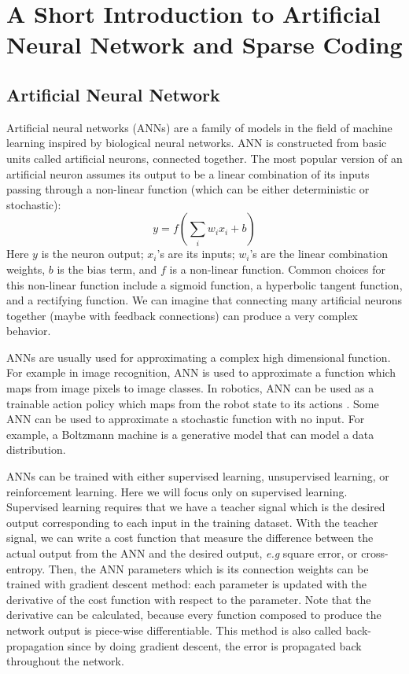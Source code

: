 \chapter{A Short Introduction to Artificial Neural Network and Sparse Coding}
\label{app:tutorial}

\section{Artificial Neural Network}

Artificial neural networks (ANNs) are a family of models in the field of machine learning inspired by biological neural networks. ANN is constructed from basic units called artificial neurons, connected together. The most popular version of an artificial neuron assumes its output to be a linear combination of its inputs passing through a non-linear function (which can be either deterministic or stochastic):
\begin{equation}
y = f\left(\sum_i w_i x_i + b\right)
\end{equation}
Here $y$ is the neuron output; $x_i$'s are its inputs; $w_i$'s are the linear combination weights, $b$ is the bias term, and $f$ is a non-linear function. Common choices for this non-linear function include a sigmoid function, a hyperbolic tangent function, and a rectifying function. We can imagine that connecting many artificial neurons together (maybe with feedback connections) can produce a very complex behavior.

ANNs are usually used for approximating a complex high dimensional function. For example in image recognition, ANN is used to approximate a function which maps from image pixels to image classes. In robotics, ANN can be used as a trainable action policy which maps from the robot state to its actions . Some ANN can be used to approximate a stochastic function with no input. For example, a Boltzmann machine is a generative model that can model a data distribution.

ANNs can be trained with either supervised learning, unsupervised learning, or reinforcement learning. Here we will focus only on supervised learning. Supervised learning requires that we have a teacher signal which is the desired output corresponding to each input in the training dataset. With the teacher signal, we can write a cost function that measure the difference between the actual output from the ANN and the desired output, \textit{e.g} square error, or cross-entropy. Then, the ANN parameters which is its connection weights can be trained with gradient descent method: each parameter is updated with the derivative of the cost function with respect to the parameter. Note that the derivative can be calculated, because every function composed to produce the network output is piece-wise differentiable. This method is also called back-propagation since by doing gradient descent, the error is propagated back throughout the network.

